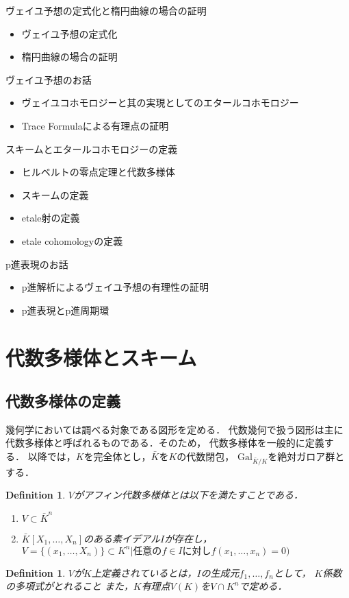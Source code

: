 \documentclass{ujarticle}
\newtheorem{dfn}[thm]{Definition}
\begin{document}
ヴェイユ予想の定式化と楕円曲線の場合の証明
\begin{itemize}
  \item ヴェイユ予想の定式化
  \item 楕円曲線の場合の証明
\end{itemize}

ヴェイユ予想のお話
\begin{itemize}
  \item ヴェイユコホモロジーと其の実現としてのエタールコホモロジー
  \item Trace Formulaによる有理点の証明
\end{itemize}

スキームとエタールコホモロジーの定義
\begin{itemize}
  \item ヒルベルトの零点定理と代数多様体
  \item スキームの定義
  \item etale射の定義
  \item etale cohomologyの定義
\end{itemize}

p進表現のお話
\begin{itemize}
  \item p進解析によるヴェイユ予想の有理性の証明
  \item p進表現とp進周期環
\end{itemize}


\section{代数多様体とスキーム}
\label{sec:代数多様体とスキーム}

\subsection{代数多様体の定義}
\label{sub:代数多様体の定義}
幾何学においては調べる対象である図形を定める．
代数幾何で扱う図形は主に代数多様体と呼ばれるものである．そのため，
代数多様体を一般的に定義する．
以降では，$K$を完全体とし，$\bar{K}$を$K$の代数閉包，
$\mathrm{Gal}_{\bar{K}/K}$を絶対ガロア群とする．
\begin{dfn}
$V$がアフィン代数多様体とは以下を満たすことである．
\begin{enumerate}
  \item $V \subset \bar{K}^n$
  \item $\bar{K}[X_1,\dots,X_n]$のある素イデアル$I$が存在し，
           $V = \{ (x_1, \dots,X_n) \} \subset K^n|
           \mbox{任意の} f \in I \mbox{に対し}f(x_1,\dots,x_n)=0)$
\end{enumerate}
\end{dfn}
\begin{dfn}
  $V$が$K$上定義されているとは，$I$の生成元$f_1,\dots,f_n$として，
  $K$係数の多項式がとれること
  また，$K$有理点$V(K)$を$V \cap K^n$で定める．
\end{dfn}
\end{document}
